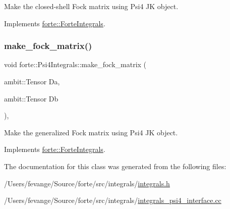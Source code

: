 Make the closed-\/shell Fock matrix using Psi4 JK object. 



Implements \mbox{\hyperlink{classforte_1_1_forte_integrals_a4cdca0a7587cad9d830ed3b333ec78cf}{forte\+::\+Forte\+Integrals}}.

\mbox{\label{classforte_1_1_psi4_integrals_abfd1e7a105ef05bfe50d175fbe766c36}} 
\subsubsection{\texorpdfstring{make\+\_\+fock\+\_\+matrix()}{make\_fock\_matrix()}}
{\footnotesize\ttfamily void forte\+::\+Psi4\+Integrals\+::make\+\_\+fock\+\_\+matrix (\begin{DoxyParamCaption}\item[{ambit\+::\+Tensor}]{Da,  }\item[{ambit\+::\+Tensor}]{Db }\end{DoxyParamCaption})\hspace{0.3cm}{\ttfamily [override]}, {\ttfamily [virtual]}}



Make the generalized Fock matrix using Psi4 JK object. 



Implements \mbox{\hyperlink{classforte_1_1_forte_integrals_aadd195fbc0c7f7b659ab9280457568e0}{forte\+::\+Forte\+Integrals}}.



The documentation for this class was generated from the following files\+:\begin{DoxyCompactItemize}
\item 
/\+Users/fevange/\+Source/forte/src/integrals/\mbox{\hyperlink{integrals_8h}{integrals.\+h}}\item 
/\+Users/fevange/\+Source/forte/src/integrals/\mbox{\hyperlink{integrals__psi4__interface_8cc}{integrals\+\_\+psi4\+\_\+interface.\+cc}}\end{DoxyCompactItemize}
